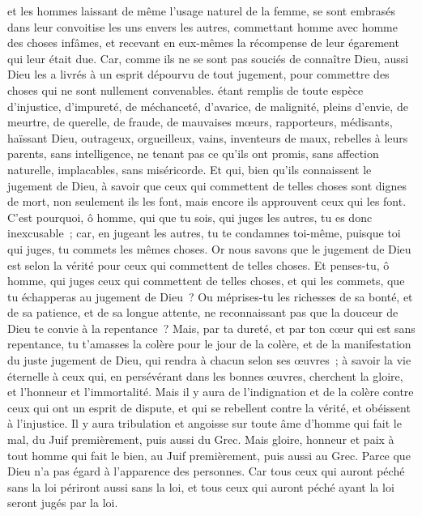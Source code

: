\begin{multicols}{2}
et les hommes laissant de même l'usage naturel de la femme, se sont embrasés dans leur convoitise les uns envers les autres, commettant homme avec homme des choses infâmes, et recevant en eux-mêmes la récompense de leur égarement qui leur était due.
Car, comme ils ne se sont pas souciés de connaître Dieu, aussi Dieu les a livrés à un esprit dépourvu de tout jugement, pour commettre des choses qui ne sont nullement convenables.
étant remplis de toute espèce d'injustice, d'impureté, de méchanceté, d'avarice, de malignité, pleins d'envie, de meurtre, de querelle, de fraude, de mauvaises mœurs,
rapporteurs, médisants, haïssant Dieu, outrageux, orgueilleux, vains, inventeurs de maux, rebelles à leurs parents,
sans intelligence, ne tenant pas ce qu'ils ont promis, sans affection naturelle, implacables, sans miséricorde.
Et qui, bien qu'ils connaissent le jugement de Dieu, à savoir que ceux qui commettent de telles choses sont dignes de mort, non seulement ils les font, mais encore ils approuvent ceux qui les font.
\VerseOne{}C'est pourquoi, ô homme, qui que tu sois, qui juges les autres, tu es donc inexcusable~; car, en jugeant les autres, tu te condamnes toi-même, puisque toi qui juges, tu commets les mêmes choses.
Or nous savons que le jugement de Dieu est selon la vérité pour ceux qui commettent de telles choses.
Et penses-tu, ô homme, qui juges ceux qui commettent de telles choses, et qui les commets, que tu échapperas au jugement de Dieu~?
Ou méprises-tu les richesses de sa bonté, et de sa patience, et de sa longue attente, ne reconnaissant pas que la douceur de Dieu te convie à la repentance~?
Mais, par ta dureté, et par ton cœur qui est sans repentance, tu t'amasses la colère pour le jour de la colère, et de la manifestation du juste jugement de Dieu,
qui rendra à chacun selon ses œuvres~;
à savoir la vie éternelle à ceux qui, en persévérant dans les bonnes œuvres, cherchent la gloire, et l'honneur et l'immortalité.
Mais il y aura de l'indignation et de la colère contre ceux qui ont un esprit de dispute, et qui se rebellent contre la vérité, et obéissent à l'injustice.
Il y aura tribulation et angoisse sur toute âme d'homme qui fait le mal, du Juif premièrement, puis aussi du Grec.
Mais gloire, honneur et paix à tout homme qui fait le bien, au Juif premièrement, puis aussi au Grec.
Parce que Dieu n'a pas égard à l'apparence des personnes.
Car tous ceux qui auront péché sans la loi périront aussi sans la loi, et tous ceux qui auront péché ayant la loi seront jugés par la loi.

\end{multicols}
